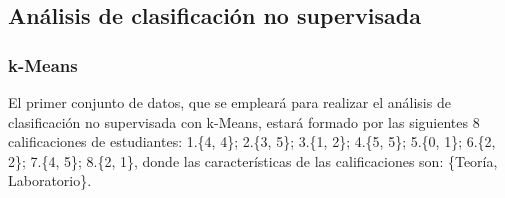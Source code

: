 \documentclass[a4paper, 12pt]{article}
\begin{document}
	\subsection{Análisis de clasificación no supervisada}
	
	\subsubsection{k-Means}
	
	El primer conjunto de datos, que se empleará para realizar el análisis de clasificación no supervisada con k-Means, estará formado por las siguientes 8 calificaciones de estudiantes: 1.\{4, 4\}; 2.\{3, 5\}; 3.\{1, 2\}; 4.\{5, 5\}; 5.\{0, 1\}; 6.\{2, 2\}; 7.\{4, 5\}; 8.\{2, 1\}, donde las características de las calificaciones son: \{Teoría, Laboratorio\}.
	
\end{document}
